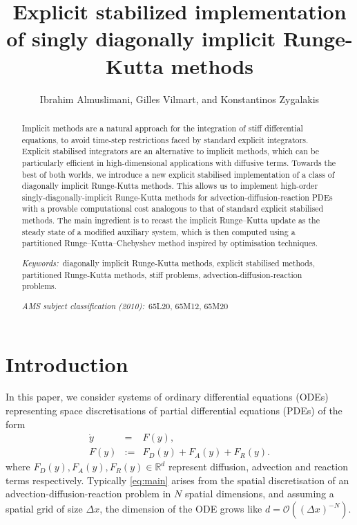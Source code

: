 \documentclass[10pt,a4paper]{article}
\title{
	Explicit stabilized implementation of singly diagonally implicit Runge-Kutta methods
}
\author{ 
	Ibrahim Almuslimani\footnotemark[1], Gilles Vilmart\footnotemark[2], and Konstantinos Zygalakis\footnotemark[3]
}
\begin{document}
\maketitle
{}
\begin{abstract}
Implicit methods are a natural approach for the integration of stiff differential equations, to avoid time-step restrictions faced by standard explicit integrators. Explicit stabilised integrators are an alternative to implicit methods, which can be particularly efficient in high-dimensional applications with diffusive terms. Towards the best of both worlds, we introduce a new explicit stabilised implementation of a class of diagonally implicit Runge-Kutta methods. This allows us to implement high-order singly-diagonally-implicit Runge-Kutta methods for advection-diffusion-reaction PDEs with a provable computational cost analogous to that of standard explicit stabilised methods. The main ingredient is to recast the implicit Runge–Kutta update as the steady state of a modified auxiliary system, which is then computed using a partitioned Runge–Kutta–Chebyshev method inspired by optimisation techniques.

\smallskip
%
\noindent
{\it Keywords:\,}
diagonally implicit Runge-Kutta methods, explicit stabilised methods, partitioned Runge-Kutta methods, stiff problems, advection-diffusion-reaction problems.
\smallskip

\noindent
{\it AMS subject classification (2010):\,}
65L20, 65M12, 65M20
\end{abstract}

 \section{Introduction}

In this paper, we consider systems of ordinary differential equations (ODEs) representing space discretisations of partial differential equations (PDEs) of the form
\begin{subequations}\label{eq:main}
\begin{eqnarray}
    \dot{y} &=& F(y), \\
    F(y) &:=& F_{D}(y)+F_{A}(y)+F_{R}(y).
\end{eqnarray}
\end{subequations}
where $F_{D}(y),F_{A}(y),F_{R}(y) \in \mathbb{R}^{d}$ represent diffusion, advection and reaction terms respectively. 
Typically \eqref{eq:main} arises from the spatial discretisation of an advection-diffusion-reaction problem in $N$ spatial dimensions, and assuming a spatial grid of size $\Delta x$, the dimension of the ODE grows like $d =\mathcal{O}((\Delta x)^{-N})$. 
\end{document}
